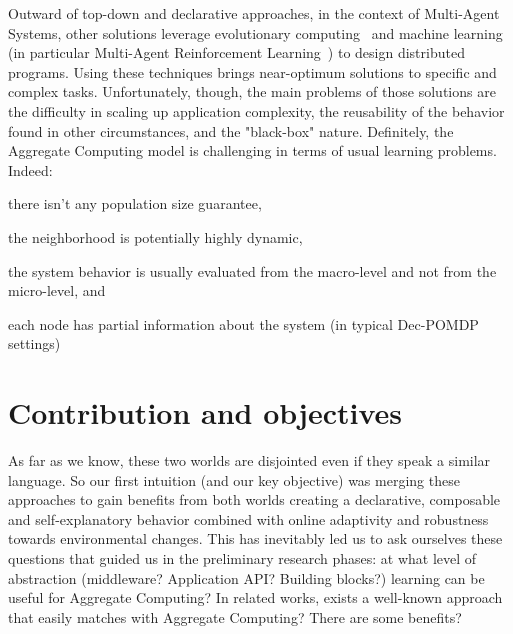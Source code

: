 \documentclass[conference]{IEEEtran}
\begin{document}
Outward of top-down and declarative approaches, in the context of Multi-Agent Systems, other solutions leverage evolutionary computing~\cite{DBLP:journals/swarm/BrambillaFBD13} and machine learning (in particular Multi-Agent Reinforcement Learning~\cite{DBLP:journals/tcyb/NguyenNN20}) to design distributed programs.
Using these techniques brings near-optimum solutions to specific and complex tasks.
Unfortunately, though, the main problems of those solutions are the difficulty in scaling up application complexity, the reusability of the behavior found in other circumstances, and the "black-box" nature. 
%
Definitely, the Aggregate Computing model is challenging in terms of usual learning problems. Indeed:
\begin{enumerate*}[label=(\roman*)]
\item there isn't any population size guarantee,
\item the neighborhood is potentially highly dynamic,
\item the system behavior is usually evaluated from the macro-level and not from the micro-level, and
\item each node has partial information about the system (in typical Dec-POMDP~\cite{DBLP:conf/uai/BernsteinZI00} settings)
\end{enumerate*}
\section{Contribution and objectives}
As far as we know, these two worlds are disjointed even if they speak a similar language. So our first intuition (and our key objective) was merging these approaches to gain benefits from both worlds creating a declarative, 
composable and self-explanatory behavior combined with online adaptivity and robustness towards environmental changes.
%
This has inevitably led us to ask ourselves these questions that guided us in the preliminary research phases: at what level of abstraction (middleware? Application API? Building blocks?) learning can be useful for Aggregate Computing? 
In related works, exists a well-known approach that easily matches with Aggregate Computing? There are some benefits?
%
\end{document}
